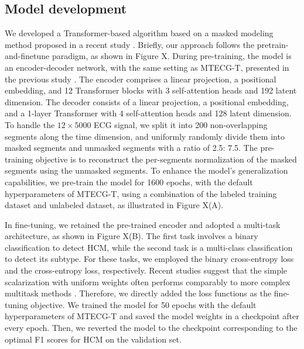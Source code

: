 \documentclass[11pt]{article}
\theoremstyle{definition}
\begin{document}




\subsection{Model development}

We developed a Transformer-based algorithm based on a masked modeling method proposed in a recent study \citep{zhou2023masked}. Briefly, our approach follows the pretrain-and-finetune paradigm, as shown in Figure X. During pre-training, the model is an encoder-decoder network, with the same setting as MTECG-T, presented in the previous study \citep{zhou2023masked}. The encoder comprises a linear projection, a positional embedding, and 12 Transformer blocks with 3 self-attention heads and 192 latent dimension. The decoder consists of a linear projection, a positional embedding, and a 1-layer Transformer with 4 self-attention heads and 128 latent dimension. To handle the $12 \times 5000$ ECG signal, we split it into 200 non-overlapping segments along the time dimension, and uniformly randomly divide them into masked segments and unmasked segments with a ratio of 2.5: 7.5. The pre-training objective is to reconstruct the per-segments normalization of the masked segments using the unmasked segments. To enhance the model's generalization capabilities, we pre-train the model for 1600 epochs, with the default hyperparameters of MTECG-T, using a combination of the labeled training dataset and unlabeled dataset, as illustrated in Figure X(A).

In fine-tuning, we retained the pre-trained encoder and adopted a multi-task architecture, as shown in Figure X(B). The first task involves a binary classification to detect HCM, while the second task is a multi-class classification to detect its subtype. For these tasks, we employed the binary cross-entropy loss and the cross-entropy loss, respectively. 
Recent studies suggest that the simple scalarization with uniform weights often performs comparably to more complex multitask methods \citep{royer2024scalarization}. 
Therefore, we directly added the loss functions as the fine-tuning objective. We trained the model for 50 epochs with the default hyperparameters of MTECG-T and saved the model weights in a checkpoint after every epoch. Then, we reverted the model to the checkpoint corresponding to the optimal F1 scores for HCM on the validation set.
\end{document}

